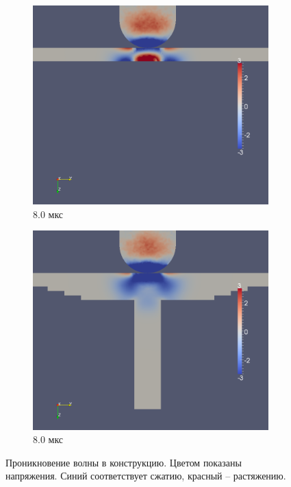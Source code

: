 \begin{figure}[htp]
\begin{subfigure}[b]{0.5\textwidth}
\centering
\includegraphics[width=\textwidth]{png/pkm-experiment/wing-only/wave/syy-0007.png}
\caption{8.0 мкс}
\end{subfigure}
\begin{subfigure}[b]{0.5\textwidth}
\centering
\includegraphics[width=\textwidth]{png/pkm-experiment/wing-stringer/wave/syy-0007.png}
\caption{8.0 мкс}
\end{subfigure}
\caption{Проникновение волны в конструкцию. Цветом показаны напряжения. Синий соответствует сжатию, красный -- растяжению.}
\label{pic:pkm_experiment_stress_middle}
\end{figure}


